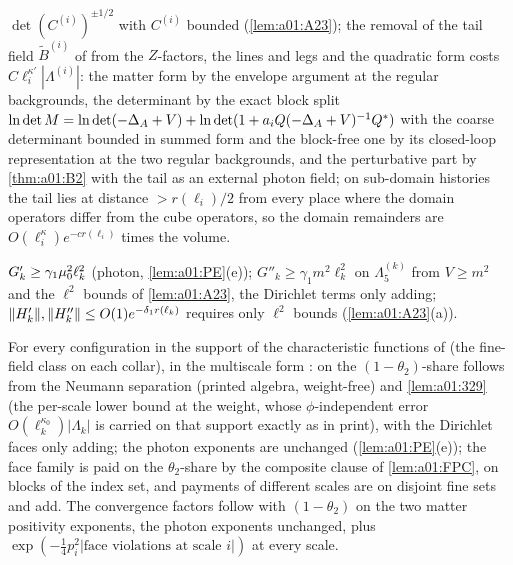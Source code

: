 \begin{description}[leftmargin=1.5em,style=nextline]
\item[{D10 (the $Z$-factors and the tail removal; \cite[(2.92)--(2.109)]{Ba2})}] $\det(C^{(i)})^{\pm1/2}$ with $C^{(i)}$ bounded (\cref{lem:a01:A23}); the removal of the tail field $\tilde B^{(i)}$ of \cite[(2.89)--(2.90)]{Ba2} from the $Z$-factors, the lines and legs and the quadratic form costs $C\ell_i^{\kappa'}|\Lambda^{(i)}|$: the matter form by the envelope argument at the regular backgrounds, the determinant by the exact block split $\ln\det M=\ln\det(-\Delta_A+V)+\ln\det(1+a_iQ(-\Delta_A+V)^{-1}Q^*)$ with the coarse determinant bounded in summed form and the block-free one by its closed-loop representation at the two regular backgrounds, and the perturbative part by \cref{thm:a01:B2} with the tail as an external photon field; on sub-domain histories the tail lies at distance $>r(\ell_i)/2$ from every place where the domain operators differ from the cube operators, so the domain remainders are $O(\ell_i^\kappa)e^{-cr(\ell_i)}$ times the volume.
\item[{D11 (the last step; \cite[(3.11)--(3.12)]{Ba2})}] $G'_k\ge\gamma_1\mu_0^2\ell_k^2$ (photon, \cref{lem:a01:PE}(e)); $G''_k\ge\gamma_1m^2\ell_k^2$ on $\Lambda_5^{(k)}$ from $V\ge m^2$ and the $\ell^2$ bounds of \cref{lem:a01:A23}, the Dirichlet terms only adding; $\lVert H'_k\rVert,\lVert H''_k\rVert\le O(1)e^{-\delta_1r(\ell_k)}$ requires only $\ell^2$ bounds (\cref{lem:a01:A23}(a)).
\item[{D12 (positivity; \cite[Prop.~3.1, (3.26)]{Ba2})}] For every configuration in the support of the characteristic functions of \cite[(3.21)]{Ba2} (the fine-field class on each collar), in the multiscale form \cite[(3.23)--(3.25)]{Ba2}: \cite[(3.26)]{Ba2} on the $(1-\theta_2)$-share follows from the Neumann separation \cite[(3.27)--(3.28)]{Ba2} (printed algebra, weight-free) and \cref{lem:a01:329} (the per-scale lower bound \cite[(3.29)]{Ba2} at the weight, whose $\phi$-independent error $O(\ell_k^{\kappa_0})|\Lambda_k|$ is carried on that support exactly as in print), with the Dirichlet faces only adding; the photon exponents are unchanged (\cref{lem:a01:PE}(e)); the face family is paid on the $\theta_2$-share by the composite clause of \cref{lem:a01:FPC}, on blocks of the index set, and payments of different scales are on disjoint fine sets and add. The convergence factors \cite[(3.31)--(3.34)]{Ba2} follow with $(1-\theta_2)$ on the two matter positivity exponents, the photon exponents unchanged, plus $\exp(-\frac14p_i^2|\text{face violations at scale }i|)$ at every scale.

\end{description}
